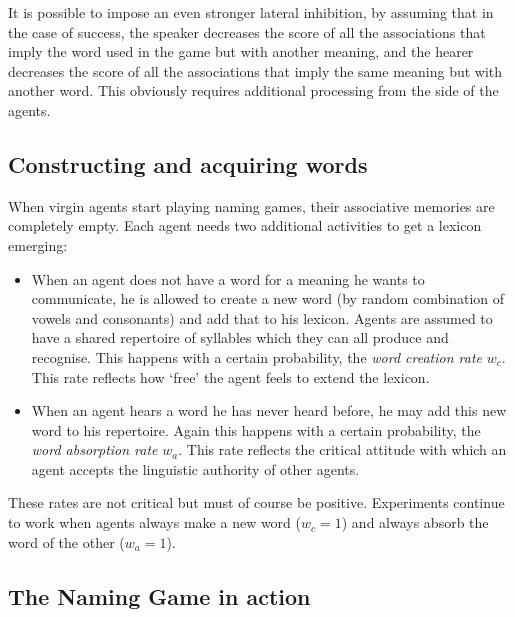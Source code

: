 It is possible to impose an even stronger
lateral inhibition, by assuming that in the case of 
success, the speaker decreases the score of 
all the associations that imply the word used in 
the game but with another meaning, and the 
hearer decreases the score of all the associations
that imply the same meaning but with another 
word. This obviously requires additional processing
from the side of the agents. 

\subsection{Constructing and acquiring words}

When virgin agents start playing naming games, their 
associative memories are completely empty. Each agent 
needs two additional activities to get a lexicon
emerging: 
\begin{itemize}
\item 
When an agent does not have a word for a
meaning he wants to communicate, he is allowed to create
a new word (by random combination of vowels and 
consonants) and add that to his 
lexicon. Agents are assumed to have a 
shared repertoire of syllables which they can all 
produce and recognise. This happens with a certain 
probability, the {\itshape word creation rate} $w_{c}$. 
This rate reflects how `free' the agent feels to 
extend the lexicon. 
\item 
When an agent hears a word he has 
never heard before, he may add this new word to his 
repertoire. Again this happens with a certain
probability, the {\itshape word absorption rate} $w_{a}$. 
This rate reflects the critical attitude with which an 
agent accepts the linguistic authority of other agents. 
\end{itemize}
These rates are not critical but must of course
be positive. Experiments continue to work 
when agents always make a new word ($w_{c}=1$) 
and always absorb the word of the other ($w_{a}=1$). 

\subsection{The Naming Game in action}
 
